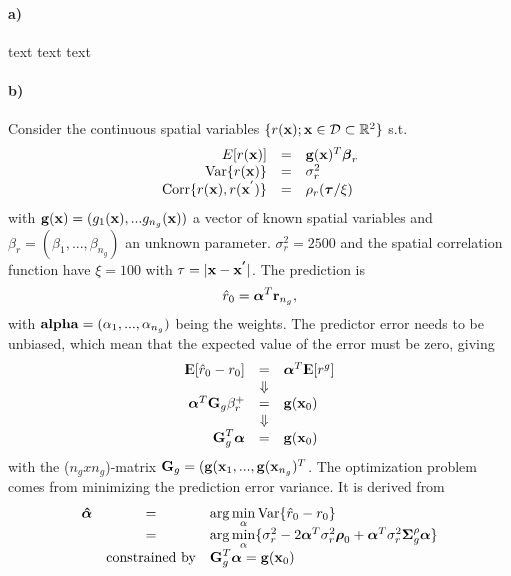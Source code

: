 \paragraph{a)}
text text text

\paragraph{b)}
Consider the continuous spatial variables $\{r(\boldsymbol{\mathbf{x}}); \boldsymbol{\mathbf{x}} \in \mathcal{D} \subset \mathbb{R}^2\}$ s.t.
\begin{equation}
\begin{array}{rcl}
     E[r(\boldsymbol{\mathbf{x}})] & = & \boldsymbol{\mathbf{g}}(\boldsymbol{\mathbf{x}})^T\boldsymbol{\mathbf{\beta}}_r \\
     \mathrm{Var}\{r(\boldsymbol{\mathbf{x}})\} & = & \sigma_r^2 \\
     \mathrm{Corr}\{r(\boldsymbol{\mathbf{x}}),r(\boldsymbol{\mathbf{x}}^{'})\} & = & \rho_r(\boldsymbol{\mathbf{\tau}}/\xi)
\end{array}
\end{equation}
with $\boldsymbol{\mathbf{g}}(\boldsymbol{\mathbf{x}}) = (g_1(\boldsymbol{\mathbf{x}}), ... g_{n_g}(\boldsymbol{\mathbf{x}}))$ a vector of known spatial variables and $\beta_r = (\beta_1, ..., \beta_{n_g})$ an unknown parameter. $\sigma_r^2 = 2500$ and the spatial correlation function have $\xi = 100$ with $\tau = |\boldsymbol{\mathbf{x}} - \boldsymbol{\mathbf{x^{'}}}|$. The prediction is 
\begin{equation}
    \hat{r}_0 = \boldsymbol{\mathbf{\alpha}}^T\boldsymbol{\mathbf{r}}_{n_g},
\end{equation}
with $\boldsymbol{\mathbf{alpha}} = (\alpha_1, ..., \alpha_{n_g})$ being the weights. 
The predictor error needs to be unbiased, which mean that the expected value of the error must be zero, giving
\begin{equation*}
\begin{array}{rcl}
    {\rm I\kern-.3em E}[\hat{r}_0 - r_0] & = & \boldsymbol{\mathbf{\alpha}}^T {\rm I\kern-.3em E}[r^g]\\
      & \Downarrow & \\
      \boldsymbol{\mathbf{\alpha}}^T \boldsymbol{\mathbf{G}}_g \beta_r^+ & = & \boldsymbol{\mathbf{g}}(\boldsymbol{\mathbf{x}}_0) \\
      & \Downarrow & \\
      \boldsymbol{\mathbf{G}}_g^T \boldsymbol{\mathbf{\alpha}} & = & \boldsymbol{\mathbf{g}}(\boldsymbol{\mathbf{x}}_0)
\end{array}
\end{equation*}
with the ($n_g x n_g$)-matrix $\boldsymbol{\mathbf{G}}_g = (\boldsymbol{\mathbf{g}}(\boldsymbol{\mathbf{x}}_1,...,\boldsymbol{\mathbf{g}}(\boldsymbol{\mathbf{x}}_{n_g})^T$.
The optimization problem comes from minimizing the prediction error variance. It is derived from
\begin{equation*}
    \begin{array}{rcl}
        \boldsymbol{\mathbf{\hat{\alpha}}} & = & \arg\min\limits_\alpha \mathrm{Var}\{\hat{r}_0 - r_0\} \\
         & = & \arg\min\limits_\alpha\{\sigma_r^2 - 2\boldsymbol{\mathbf{\alpha}}^T\sigma_r^2\boldsymbol{\mathbf{\rho}}_0 + \boldsymbol{\mathbf{\alpha}}^T\sigma_r^2\boldsymbol{\mathbf{\Sigma}}_g^\rho \boldsymbol{\mathbf{\alpha}}\} \\
          & \textrm{constrained by} & \boldsymbol{\mathbf{G}}_g^T \boldsymbol{\mathbf{\alpha}} = \boldsymbol{\mathbf{g}}(\boldsymbol{\mathbf{x}}_0)
    \end{array}
\end{equation*}
